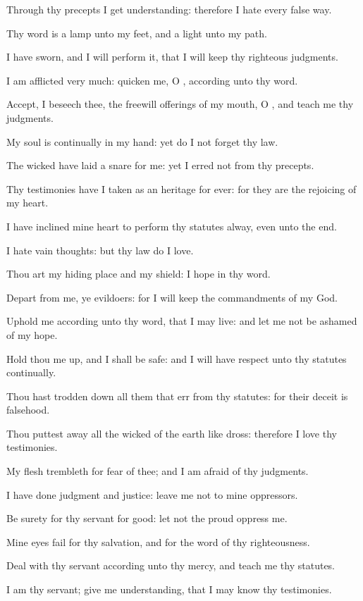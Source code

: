 \verse Through thy precepts I get understanding: therefore I hate every false way.

\verse Thy word is a lamp unto my feet, and a light unto my path.

\verse I have sworn, and I will perform it, that I will keep thy righteous judgments.

\verse I am afflicted very much: quicken me, O \LORD, according unto thy word.

\verse Accept, I beseech thee, the freewill offerings of my mouth, O \LORD, and teach me thy judgments.

\verse My soul is continually in my hand: yet do I not forget thy law.

\verse The wicked have laid a snare for me: yet I erred not from thy precepts.

\verse Thy testimonies have I taken as an heritage for ever: for they are the rejoicing of my heart.

\verse I have inclined mine heart to perform thy statutes alway, even unto the end.

\verse I hate vain thoughts: but thy law do I love.

\verse Thou art my hiding place and my shield: I hope in thy word.

\verse Depart from me, ye evildoers: for I will keep the commandments of my God.

\verse Uphold me according unto thy word, that I may live: and let me not be ashamed of my hope.

\verse Hold thou me up, and I shall be safe: and I will have respect unto thy statutes continually.

\verse Thou hast trodden down all them that err from thy statutes: for their deceit is falsehood.

\verse Thou puttest away all the wicked of the earth like dross: therefore I love thy testimonies.

\verse My flesh trembleth for fear of thee; and I am afraid of thy judgments.

\verse I have done judgment and justice: leave me not to mine oppressors.

\verse Be surety for thy servant for good: let not the proud oppress me.

\verse Mine eyes fail for thy salvation, and for the word of thy righteousness.

\verse Deal with thy servant according unto thy mercy, and teach me thy statutes.

\verse I am thy servant; give me understanding, that I may know thy testimonies.

